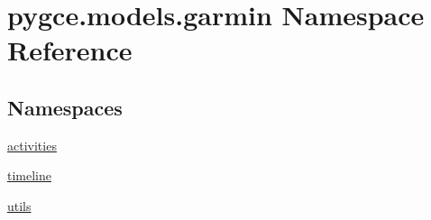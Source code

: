 \hypertarget{namespacepygce_1_1models_1_1garmin}{}\section{pygce.\+models.\+garmin Namespace Reference}
\label{namespacepygce_1_1models_1_1garmin}
\subsection*{Namespaces}
\begin{DoxyCompactItemize}
\item 
 \hyperlink{namespacepygce_1_1models_1_1garmin_1_1activities}{activities}
\item 
 \hyperlink{namespacepygce_1_1models_1_1garmin_1_1timeline}{timeline}
\item 
 \hyperlink{namespacepygce_1_1models_1_1garmin_1_1utils}{utils}
\end{DoxyCompactItemize}
